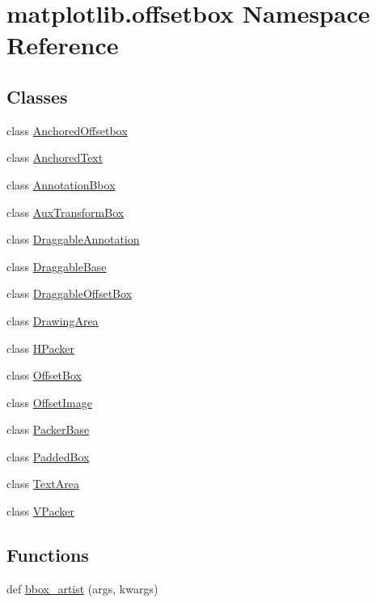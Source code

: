 \hypertarget{namespacematplotlib_1_1offsetbox}{}\section{matplotlib.\+offsetbox Namespace Reference}
\label{namespacematplotlib_1_1offsetbox}
\subsection*{Classes}
\begin{DoxyCompactItemize}
\item 
class \hyperlink{classmatplotlib_1_1offsetbox_1_1AnchoredOffsetbox}{Anchored\+Offsetbox}
\item 
class \hyperlink{classmatplotlib_1_1offsetbox_1_1AnchoredText}{Anchored\+Text}
\item 
class \hyperlink{classmatplotlib_1_1offsetbox_1_1AnnotationBbox}{Annotation\+Bbox}
\item 
class \hyperlink{classmatplotlib_1_1offsetbox_1_1AuxTransformBox}{Aux\+Transform\+Box}
\item 
class \hyperlink{classmatplotlib_1_1offsetbox_1_1DraggableAnnotation}{Draggable\+Annotation}
\item 
class \hyperlink{classmatplotlib_1_1offsetbox_1_1DraggableBase}{Draggable\+Base}
\item 
class \hyperlink{classmatplotlib_1_1offsetbox_1_1DraggableOffsetBox}{Draggable\+Offset\+Box}
\item 
class \hyperlink{classmatplotlib_1_1offsetbox_1_1DrawingArea}{Drawing\+Area}
\item 
class \hyperlink{classmatplotlib_1_1offsetbox_1_1HPacker}{H\+Packer}
\item 
class \hyperlink{classmatplotlib_1_1offsetbox_1_1OffsetBox}{Offset\+Box}
\item 
class \hyperlink{classmatplotlib_1_1offsetbox_1_1OffsetImage}{Offset\+Image}
\item 
class \hyperlink{classmatplotlib_1_1offsetbox_1_1PackerBase}{Packer\+Base}
\item 
class \hyperlink{classmatplotlib_1_1offsetbox_1_1PaddedBox}{Padded\+Box}
\item 
class \hyperlink{classmatplotlib_1_1offsetbox_1_1TextArea}{Text\+Area}
\item 
class \hyperlink{classmatplotlib_1_1offsetbox_1_1VPacker}{V\+Packer}
\end{DoxyCompactItemize}
\subsection*{Functions}
\begin{DoxyCompactItemize}
\item 
def \hyperlink{namespacematplotlib_1_1offsetbox_a65841d2c31f806615ade2c0c75212af7}{bbox\+\_\+artist} (args, kwargs)
\end{DoxyCompactItemize}
